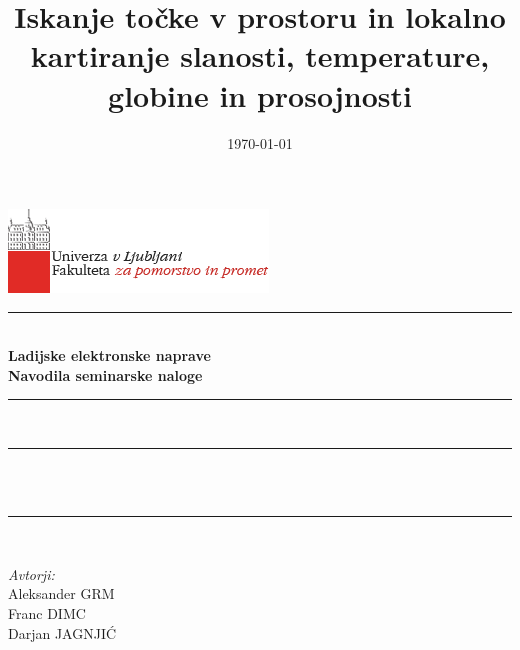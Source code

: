 \documentclass[11pt]{article}
\title{Iskanje točke v prostoru in lokalno kartiranje slanosti, temperature, globine in prosojnosti}
\date{\today}
\author{}
\makeatletter
\let\thetitle\@title
\let\thedate\@date
\makeatother
\begin{document}

\begin{titlepage}
	\centering
	\vspace*{-2cm}
    \includegraphics[scale = 0.75]{logo_FPP.png}\\[1.0 cm]
    
	\rule{\linewidth}{1 mm} \\[0.4 cm]
	{ \huge \bfseries Ladijske elektronske naprave} \\[0.5 cm]
	{ \Large \bfseries Navodila seminarske naloge}
	\rule{\linewidth}{1 mm} \\[1 cm]
	
	\rule{\linewidth}{0.5 mm} \\[0.4 cm]
	{ \large \bfseries \thetitle}\\[0.0 cm]
	\rule{\linewidth}{0.5 mm} \\[2 cm]
	
	\begin{minipage}{0.4\textwidth}
		\begin{flushleft} \large
			\emph{Avtorji:}\\[0.2 cm]
			Aleksander GRM\\
			Franc DIMC\\
			Darjan JAGNJIĆ
			\end{flushleft}
			\end{minipage}~
			\begin{minipage}{0.4\textwidth}
			\begin{flushright}
			\end{flushright}
	\end{minipage}\\[2 cm]
	
	\vfill
	
	{\large \thedate}\\[2 cm]
 
	
	
\end{titlepage}


\tableofcontents
\pagebreak

\end{document}
